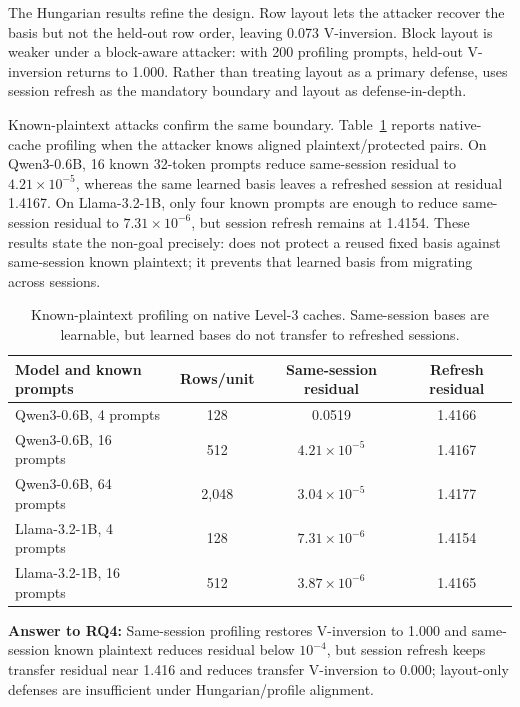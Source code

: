 The Hungarian results refine the design. Row layout lets the attacker recover the basis but not the held-out row order, leaving 0.073 V-inversion. Block layout is weaker under a block-aware attacker: with 200 profiling prompts, held-out V-inversion returns to 1.000. Rather than treating layout as a primary defense, \sys{} uses session refresh as the mandatory boundary and layout as defense-in-depth.

Known-plaintext attacks confirm the same boundary. Table~\ref{tab:kpa} reports native-cache profiling when the attacker knows aligned plaintext/protected pairs. On Qwen3-0.6B, 16 known 32-token prompts reduce same-session residual to $4.21\times10^{-5}$, whereas the same learned basis leaves a refreshed session at residual 1.4167. On Llama-3.2-1B, only four known prompts are enough to reduce same-session residual to $7.31\times10^{-6}$, but session refresh remains at 1.4154. These results state the non-goal precisely: \sys{} does not protect a reused fixed basis against same-session known plaintext; it prevents that learned basis from migrating across sessions.

\begin{table}[t]
\centering
\caption{Known-plaintext profiling on native Level-3 caches. Same-session bases are learnable, but learned bases do not transfer to refreshed sessions.}
\label{tab:kpa}
\begin{tabular}{lccc}
\toprule
Model and known prompts & Rows/unit & Same-session residual & Refresh residual \\
\midrule
Qwen3-0.6B, 4 prompts & 128 & 0.0519 & 1.4166 \\
Qwen3-0.6B, 16 prompts & 512 & $4.21\times10^{-5}$ & 1.4167 \\
Qwen3-0.6B, 64 prompts & 2,048 & $3.04\times10^{-5}$ & 1.4177 \\
Llama-3.2-1B, 4 prompts & 128 & $7.31\times10^{-6}$ & 1.4154 \\
Llama-3.2-1B, 16 prompts & 512 & $3.87\times10^{-6}$ & 1.4165 \\
\bottomrule
\end{tabular}
\end{table}

\textbf{Answer to RQ4:} Same-session profiling restores V-inversion to 1.000 and same-session known plaintext reduces residual below $10^{-4}$, but session refresh keeps transfer residual near 1.416 and reduces transfer V-inversion to 0.000; layout-only defenses are insufficient under Hungarian/profile alignment.

